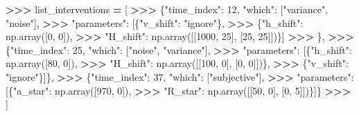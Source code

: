 \documentclass[
]{article}
\newenvironment{Shaded}{\begin{snugshade}}{\end{snugshade}}
\newcommand{\DecValTok}[1]{\textcolor[rgb]{0.00,0.00,0.81}{#1}}
\newcommand{\NormalTok}[1]{#1}
\newcommand{\OperatorTok}[1]{\textcolor[rgb]{0.81,0.36,0.00}{\textbf{#1}}}
\newcommand{\StringTok}[1]{\textcolor[rgb]{0.31,0.60,0.02}{#1}}
\begin{document}
\begin{Shaded}
\begin{Highlighting}[]
\OperatorTok{\textgreater{}\textgreater{}\textgreater{}}\NormalTok{ list\_interventions }\OperatorTok{=}\NormalTok{ [}
\OperatorTok{\textgreater{}\textgreater{}\textgreater{}}\NormalTok{     \{}\StringTok{"time\_index"}\NormalTok{: }\DecValTok{12}\NormalTok{, }\StringTok{"which"}\NormalTok{: [}\StringTok{"variance"}\NormalTok{, }\StringTok{"noise"}\NormalTok{],}
\OperatorTok{\textgreater{}\textgreater{}\textgreater{}}      \StringTok{"parameters"}\NormalTok{: [\{}\StringTok{"v\_shift"}\NormalTok{: }\StringTok{"ignore"}\NormalTok{\},}
\OperatorTok{\textgreater{}\textgreater{}\textgreater{}}\NormalTok{                     \{}\StringTok{"h\_shift"}\NormalTok{: np.array([}\DecValTok{0}\NormalTok{, }\DecValTok{0}\NormalTok{]),}
\OperatorTok{\textgreater{}\textgreater{}\textgreater{}}                      \StringTok{"H\_shift"}\NormalTok{: np.array([[}\DecValTok{1000}\NormalTok{, }\DecValTok{25}\NormalTok{], [}\DecValTok{25}\NormalTok{, }\DecValTok{25}\NormalTok{]])\}]}
\OperatorTok{\textgreater{}\textgreater{}\textgreater{}}\NormalTok{      \},}
\OperatorTok{\textgreater{}\textgreater{}\textgreater{}}\NormalTok{     \{}\StringTok{"time\_index"}\NormalTok{: }\DecValTok{25}\NormalTok{, }\StringTok{"which"}\NormalTok{: [}\StringTok{"noise"}\NormalTok{, }\StringTok{"variance"}\NormalTok{],}
\OperatorTok{\textgreater{}\textgreater{}\textgreater{}}      \StringTok{"parameters"}\NormalTok{: [\{}\StringTok{"h\_shift"}\NormalTok{: np.array([}\DecValTok{80}\NormalTok{, }\DecValTok{0}\NormalTok{]),}
\OperatorTok{\textgreater{}\textgreater{}\textgreater{}}                      \StringTok{"H\_shift"}\NormalTok{: np.array([[}\DecValTok{100}\NormalTok{, }\DecValTok{0}\NormalTok{], [}\DecValTok{0}\NormalTok{, }\DecValTok{0}\NormalTok{]])\},}
\OperatorTok{\textgreater{}\textgreater{}\textgreater{}}\NormalTok{                     \{}\StringTok{"v\_shift"}\NormalTok{: }\StringTok{"ignore"}\NormalTok{\}]\},}
\OperatorTok{\textgreater{}\textgreater{}\textgreater{}}\NormalTok{     \{}\StringTok{"time\_index"}\NormalTok{: }\DecValTok{37}\NormalTok{, }\StringTok{"which"}\NormalTok{: [}\StringTok{"subjective"}\NormalTok{],}
\OperatorTok{\textgreater{}\textgreater{}\textgreater{}}      \StringTok{"parameters"}\NormalTok{: [\{}\StringTok{"a\_star"}\NormalTok{: np.array([}\DecValTok{970}\NormalTok{, }\DecValTok{0}\NormalTok{]),}
\OperatorTok{\textgreater{}\textgreater{}\textgreater{}}                      \StringTok{"R\_star"}\NormalTok{: np.array([[}\DecValTok{50}\NormalTok{, }\DecValTok{0}\NormalTok{], [}\DecValTok{0}\NormalTok{, }\DecValTok{5}\NormalTok{]])\}]\}}
\OperatorTok{\textgreater{}\textgreater{}\textgreater{}}\NormalTok{ ]}
\end{Highlighting}
\end{Shaded}
\end{document}
